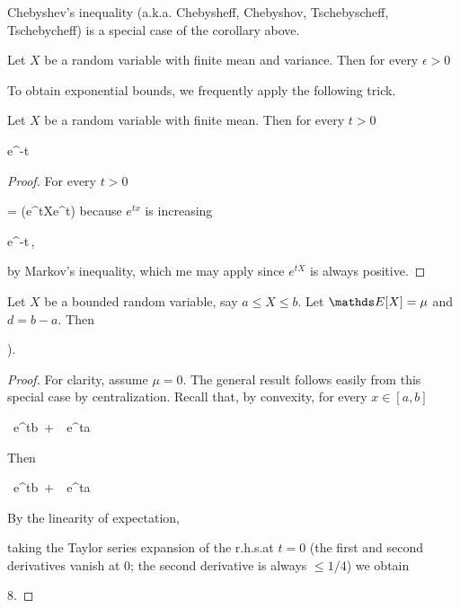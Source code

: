 \documentclass[scombinatorics.tex]{subfiles}
\begin{document}
Chebyshev's inequality (a.k.a. Chebysheff, Chebyshov, Tschebyscheff, Tschebycheff) is a special case of the corollary above.

\begin{void_thm}\label{Chebyshev}
    Let $X$ be a random variable with finite mean and variance.
    Then for every $\epsilon>0$
    
    {\le}
    {}\QED
\end{void_thm}

To obtain exponential bounds, we frequently apply the following trick.

\begin{void_thm}\label{lem_chernoff_method}
  Let $X$ be a random variable with finite mean.
  Then for every $t>0$

  {\le}
  {e^{-t\epsilon}\,\Ex\big[e^{tX}\big]}
\end{void_thm}

\begin{proof}
  For  every $t>0$

  {=}
  {\Pr\big(e^{tX}\ge e^{t\epsilon}\big)}
  \hfill because $e^{tx}$ is increasing
  
  \ceq{}
  {\le}
  {e^{-t\epsilon}\,\Ex\big[e^{tX}\big],}

  by Markov's inequality, which me may apply since $e^{tX}$ is always positive. 
\end{proof}


  \begin{void_thm}\label{lem_Hoeffding}
    Let $X$ be a bounded random variable, say $a\le X\le b$. 
    Let $\Ex[X]=\mu$ and $d=b-a$.
    Then
    
    \ceq{\hfill\Ex\Big[e^{t(X-\mu)}\Big]}
    {\le}
    {\Big).}\smallskip
  \end{void_thm}

\begin{proof}
  For clarity, assume $\mu=0$.
  The general result follows easily from this special case by centralization.
  Recall that, by convexity, for every $x\in[a,b]$

  {\le}
  {\ e^{tb}\ +\ \ e^{ta}}

  Then

  {\le}
  {\ e^{tb}\ +\ \ e^{ta}}

  By the linearity of expectation,

  \ceq{\hfill\Ex\Big[e^{tX}\Big]}
  {\le}
  {}

  \ceq{\hfill\log\Ex\Big[e^{tX}\Big]}
  {\le}
  {\log{}}

  taking the Taylor series expansion of the r.h.s.\@ at $t=0$ (the first and second derivatives vanish at $0$; the second derivative is always $\le 1/4$) we obtain

  \ceq{\hfill\log\Ex\Big[e^{tX}\Big]}
  {\le}
  {8.}
\end{proof}
\end{document}

